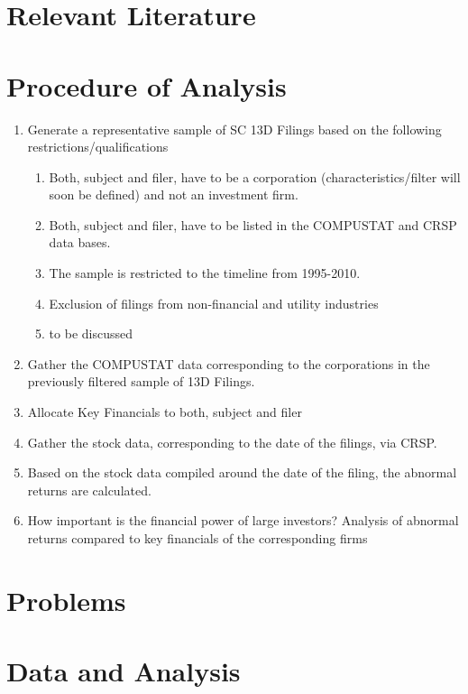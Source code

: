 \documentclass[11pt,openright]{article}
\begin{document}
\section{Relevant Literature}

\section{Procedure of Analysis}

\begin{enumerate}
\item Generate a representative sample of SC 13D Filings based on the following restrictions/qualifications

	\begin{enumerate}
	\item Both, subject and filer, have to be a corporation (characteristics/filter will soon be defined) and not an investment firm.
  \item Both, subject and filer, have to be listed in the COMPUSTAT and CRSP data bases.
	\item The sample is restricted to the timeline from 1995-2010.
	\item Exclusion of filings from non-financial and utility industries \citep{Brigida2012}
	\item to be discussed
	\end{enumerate}

\item Gather the COMPUSTAT data corresponding to the corporations in the previously filtered sample of 13D Filings.
\item Allocate Key Financials to both, subject and filer
\item Gather the stock data, corresponding to the date of the filings, via CRSP.
\item Based on the stock data compiled around the date of the filing, the abnormal returns are calculated. 
\item How important is the financial power of large investors? Analysis of abnormal returns compared to key financials of the corresponding firms

\end{enumerate}


\section{Problems}






\section{Data and Analysis}

\printbibliography
\end{document}
